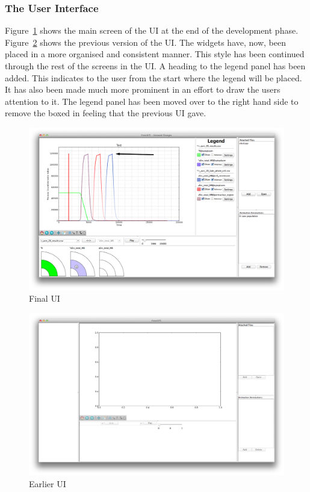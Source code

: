 \subsubsection{The User Interface}

Figure~\ref{fig:main_ui} shows the main screen of the \ac{UI} at the end of the development phase.  Figure~\ref{fig:old_ui} shows the previous version of the \ac{UI}.  The widgets have, now, been placed in a more organised and consistent manner.  This style has been continued through the rest of the screens in the \ac{UI}.  A heading to the legend panel has been added.  This indicates to the user from the start where the legend will be placed.  It has also been made much more prominent in an effort to draw the users attention to it.  The legend panel has been moved over to the right hand side to remove the boxed in feeling that the previous \ac{UI} gave.

\begin{figure}[h!]
    \centering
    \includegraphics[width=\textwidth]{images/main_ui.png}
    \caption{Final \ac{UI}}
    \label{fig:main_ui}
\end{figure}

\begin{figure}[h!]
    \centering
    \includegraphics[width=\textwidth]{images/old_ui.png}
    \caption{Earlier \ac{UI}}
    \label{fig:old_ui}
\end{figure}


